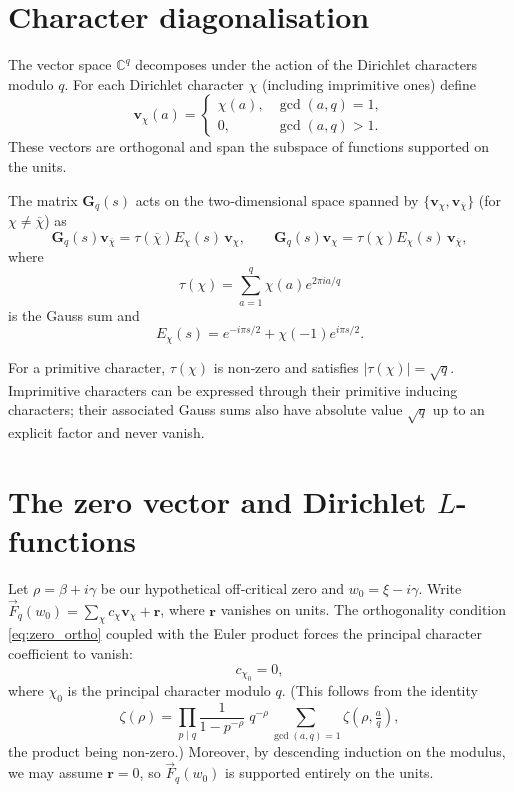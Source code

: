 \documentclass[12pt,a4paper]{article}
\theoremstyle{definition}
\begin{document}
\section{Character diagonalisation}

The vector space \(\mathbb{C}^q\) decomposes under the action of the Dirichlet characters modulo \(q\).  For each Dirichlet character \(\chi\) (including imprimitive ones) define
\[
\mathbf{v}_\chi(a) = \begin{cases}
\chi(a), & \gcd(a,q)=1,\\
0, & \gcd(a,q)>1.
\end{cases}
\]
These vectors are orthogonal and span the subspace of functions supported on the units.  

The matrix \(\mathbf{G}_q(s)\) acts on the two‑dimensional space spanned by \(\{\mathbf{v}_\chi,\mathbf{v}_{\overline{\chi}}\}\) (for \(\chi\neq\overline{\chi}\)) as
\[
\mathbf{G}_q(s) \mathbf{v}_{\overline{\chi}} = \tau(\overline{\chi})E_\chi(s)\,\mathbf{v}_\chi,\qquad
\mathbf{G}_q(s) \mathbf{v}_\chi = \tau(\chi)E_\chi(s)\,\mathbf{v}_{\overline{\chi}},
\]
where
\[
\tau(\chi) = \sum_{a=1}^q \chi(a) e^{2\pi i a/q}
\]
is the Gauss sum and
\[
E_\chi(s) = e^{-i\pi s/2} + \chi(-1)e^{i\pi s/2}.
\]

For a primitive character, \(\tau(\chi)\) is non‑zero and satisfies \(|\tau(\chi)|=\sqrt{q}\).  Imprimitive characters can be expressed through their primitive inducing characters; their associated Gauss sums also have absolute value \(\sqrt{q}\) up to an explicit factor and never vanish.

\section{The zero vector and Dirichlet \(L\)-functions}

Let \(\rho = \beta+i\gamma\) be our hypothetical off‑critical zero and \(w_0=\xi-i\gamma\).  Write \(\vec{F}_q(w_0) = \sum_\chi c_\chi \mathbf{v}_\chi + \mathbf{r}\), where \(\mathbf{r}\) vanishes on units.  The orthogonality condition \eqref{eq:zero_ortho} coupled with the Euler product forces the principal character coefficient to vanish:
\begin{equation}\label{eq:chip0}
c_{\chi_0} = 0,
\end{equation}
where \(\chi_0\) is the principal character modulo \(q\).  (This follows from the identity
\[
\zeta(\rho) = \prod_{p\mid q} \frac{1}{1-p^{-\rho}}\; q^{-\rho} \sum_{\gcd(a,q)=1} \zeta(\rho,\tfrac{a}{q}),
\]
the product being non‑zero.)  Moreover, by descending induction on the modulus, we may assume \(\mathbf{r}=0\), so \(\vec{F}_q(w_0)\) is supported entirely on the units.
\end{document}
